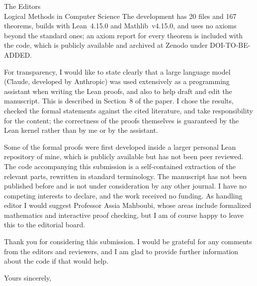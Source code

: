 \documentclass[11pt]{letter}
\begin{document}
\begin{letter}{The Editors\\Logical Methods in Computer Science}
The development has 20 files and 167 theorems, builds with Lean~4.15.0 and Mathlib~v4.15.0, and uses no axioms beyond the standard ones; an axiom report for every theorem is included with the code, which is publicly available and archived at Zenodo under DOI-TO-BE-ADDED.

For transparency, I would like to state clearly that a large language model (Claude, developed by Anthropic) was used extensively as a programming assistant when writing the Lean proofs, and also to help draft and edit the manuscript. This is described in Section~8 of the paper. I chose the results, checked the formal statements against the cited literature, and take responsibility for the content; the correctness of the proofs themselves is guaranteed by the Lean kernel rather than by me or by the assistant.

Some of the formal proofs were first developed inside a larger personal Lean repository of mine, which is publicly available but has not been peer reviewed. The code accompanying this submission is a self-contained extraction of the relevant parts, rewritten in standard terminology. The manuscript has not been published before and is not under consideration by any other journal. I have no competing interests to declare, and the work received no funding. As handling editor I would suggest Professor Assia Mahboubi, whose areas include formalized mathematics and interactive proof checking, but I am of course happy to leave this to the editorial board.

Thank you for considering this submission. I would be grateful for any comments from the editors and reviewers, and I am glad to provide further information about the code if that would help.

\closing{Yours sincerely,}

\end{letter}
\end{document}
